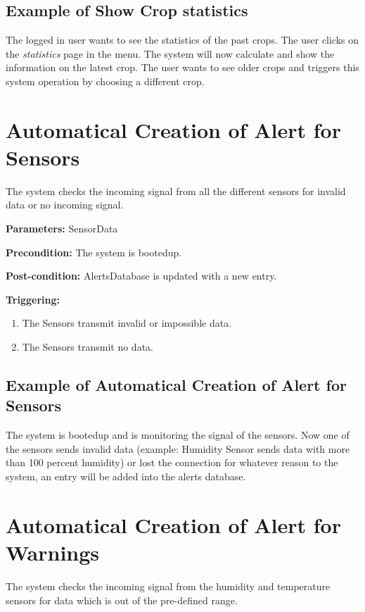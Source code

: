 \subsection{Example of Show Crop statistics}
The logged in user wants to see the statistics of the past crops.
The user clicks on the \emph{statistics} page in the menu.
The system will now calculate and show the information on the latest crop.
The user wants to see older crops and triggers this system operation by choosing
a different crop.


\break
\section{Automatical Creation of Alert for Sensors}
\label{operation:AddAlertForSensors}
The system checks the incoming signal from all the different sensors for invalid
data or no incoming signal.

\begin{description}

\item \textbf{Parameters:} SensorData
\item \textbf{Precondition:} The system is bootedup.
\item \textbf{Post-condition:} AlertsDatabase is updated with a new entry.

\item \textbf{Triggering:}
\begin{enumerate}
\item The Sensors transmit invalid or impossible data.
\item The Sensors transmit no data.
\end{enumerate}
\end{description}

\subsection{Example of Automatical Creation of Alert for Sensors}
The system is bootedup and is monitoring the signal of the sensors.
Now one of the sensors sends invalid data (example: Humidity Sensor sends data
with more than 100 percent humidity) or lost the connection for whatever reason
to the system, an entry will be added into the alerts database.




\section{Automatical Creation of Alert for Warnings}
\label{operation:AddAlertForWarnigns}
The system checks the incoming signal from the humidity and temperature sensors
for data which is out of the pre-defined range.

